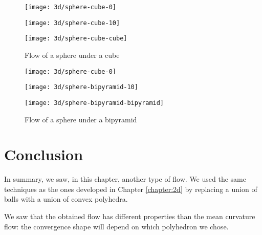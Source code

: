 \begin{figure}[h]
    \centering
    \begin{minipage}{0.32\linewidth}
        \centering
        \texttt{[image: 3d/sphere-cube-0]}
    \end{minipage}
    \begin{minipage}{0.32\linewidth}
        \centering
        \texttt{[image: 3d/sphere-cube-10]}
    \end{minipage}
    \begin{minipage}{0.32\linewidth}
        \centering
        \texttt{[image: 3d/sphere-cube-cube]}
    \end{minipage}

    \caption{Flow of a sphere under a cube}
    \label{fig:3d-flow-sphere-cube}
\end{figure}

\begin{figure}[h]
    \centering
    \begin{minipage}{0.32\linewidth}
        \centering
        \texttt{[image: 3d/sphere-cube-0]}
    \end{minipage}
    \begin{minipage}{0.32\linewidth}
        \centering
        \texttt{[image: 3d/sphere-bipyramid-10]}
    \end{minipage}
    \begin{minipage}{0.32\linewidth}
        \centering
        \texttt{[image: 3d/sphere-bipyramid-bipyramid]}
    \end{minipage}

    \caption{Flow of a sphere under a bipyramid}
    \label{fig:3d-flow-sphere-bipyramid}
\end{figure}

\section{Conclusion}

In summary, we saw, in this chapter, another type of flow. We used the same
techniques as the ones developed in Chapter \ref{chapter:2d} by replacing a
union of balls with a union of convex polyhedra.

We saw that the obtained flow has different properties than the mean curvature
flow: the convergence shape will depend on which polyhedron we chose.



